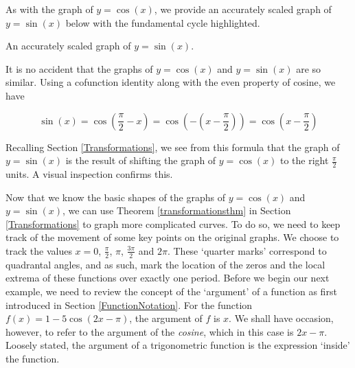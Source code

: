 As with the graph of $y=\cos(x)$, we provide an accurately scaled graph of $y = \sin(x)$ below with the fundamental cycle highlighted.

\medskip

\noindent\begin{minipage}{\textwidth}
\begin{center}
\end{center} 
\captionsetup{type=figure}
\caption{An accurately scaled graph of $y = \sin(x)$.}
\end{minipage}

\medskip

It is no accident that the graphs of $y = \cos(x)$ and $y = \sin(x)$ are so similar.  Using a cofunction identity along with the even property of cosine, we have

\[ \sin(x) = \cos\left(\frac{\pi}{2} - x\right) = \cos\left(-\left(x - \frac{\pi}{2}\right)\right) = \cos\left(x - \frac{\pi}{2}\right)\]

Recalling Section \ref{Transformations}, we see from this formula that the graph of $y=\sin(x)$ is the result of shifting the graph of $y = \cos(x)$ to the right $\frac{\pi}{2}$ units.  A visual inspection confirms this. 

\smallskip

Now that we know the basic shapes of the graphs of $y = \cos(x)$ and $y = \sin(x)$, we can use Theorem \ref{transformationsthm} in Section \ref{Transformations} to graph more complicated curves.  To do so, we need to keep track of the movement of some key points on the original graphs. We choose to track the values $x = 0$, $\frac{\pi}{2}$, $\pi$, $\frac{3\pi}{2}$ and $2\pi$.  These `quarter marks' correspond to quadrantal angles, and as such, mark the location of the zeros and the local extrema of these functions over exactly one period.  Before we begin our next example, we need to review the concept of the `argument' of a function as first introduced in Section \ref{FunctionNotation}.  For the function $f(x) = 1 - 5\cos(2x-\pi)$, the argument of $f$ is $x$.  We shall have occasion, however, to refer to the argument of the \textit{cosine}, which in this case is $2x-\pi$.  Loosely stated, the argument of a trigonometric function is the expression `inside' the function.

\medskip

